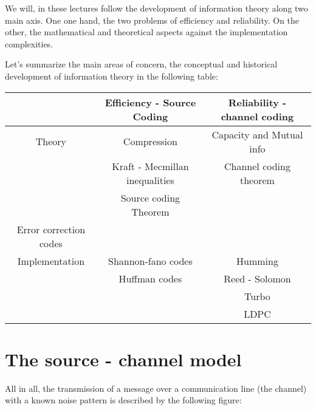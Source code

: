 We will, in these lectures follow the development of information theory along two main axis. One one hand, the two problems of efficiency and reliability. On the other, the mathematical and theoretical aspects against the implementation complexities.

Let's summarize the main areas of concern, the conceptual and historical development of information theory in the following table:

\begin{center}
	\begin{tabular}{  c | c | c } 
		 		& Efficiency - Source Coding & Reliability - channel coding \\ 
		 		\hline
		Theory & Compression & Capacity and Mutual info \\
		 	   & Kraft - Mecmillan  inequalities & Channel  coding theorem \\ 
 	           & Source coding Theorem & \\ Error correction codes \\
 	           \hline
		Implementation & Shannon-fano codes & Humming \\ 
		               & Huffman codes & Reed - Solomon \\	
		               &  & Turbo \\
		               &  & LDPC \\		
\end{tabular}
\end{center}

\section{The source - channel model}

All in all, the transmission of a message over a communication line (the channel) with a known noise pattern is described by the following figure:   

